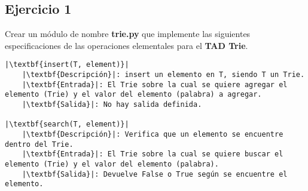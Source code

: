 \documentclass{article}
\begin{document}



\subsection*{Ejercicio 1}
Crear un módulo de nombre \textbf{trie.py} que implemente las siguientes especificaciones de las operaciones elementales para el \textbf{TAD Trie}.
\begin{lstlisting}
|\textbf{insert(T, element)}|
    |\textbf{Descripción}|: insert un elemento en T, siendo T un Trie.
    |\textbf{Entrada}|: El Trie sobre la cual se quiere agregar el elemento (Trie) y el valor del elemento (palabra) a agregar.
    |\textbf{Salida}|: No hay salida definida.

|\textbf{search(T, element)}|
    |\textbf{Descripción}|: Verifica que un elemento se encuentre dentro del Trie.
    |\textbf{Entrada}|: El Trie sobre la cual se quiere buscar el elemento (Trie) y el valor del elemento (palabra).
    |\textbf{Salida}|: Devuelve False o True según se encuentre el elemento.
\end{lstlisting}
\end{document}
